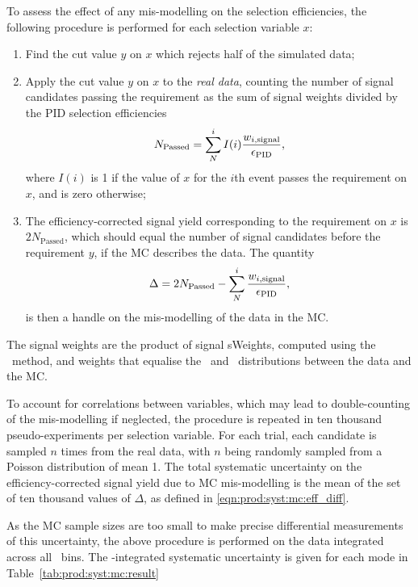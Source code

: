 To assess the effect of any mis-modelling on the selection efficiencies, the 
following procedure is performed for each selection variable $x$:
\begin{enumerate}
  \item Find the cut value $y$ on $x$ which rejects half of the simulated data;
  \item Apply the cut value $y$ on $x$ to the \emph{real data}, counting the 
    number of signal candidates passing the requirement as the sum of signal 
    weights divided by the \ac{PID} selection efficiencies
    \begin{equation}
      N_{\text{Passed}} = \sum_{N}^{i} I(i)\frac{w_{i,\text{signal}}}{\epsilon_{\textnormal{PID}}},
    \end{equation}
    where $I(i)$ is 1 if the value of $x$ for the $i$th event passes the 
    requirement on $x$, and is zero otherwise;
  \item The efficiency-corrected signal yield corresponding to the requirement 
    on $x$ is $2N_{\text{Passed}}$, which should equal the number of signal 
    candidates before the requirement $y$, if the \ac{MC} describes the data.  
    The quantity
    \begin{equation}
      \Delta = 2N_{\text{Passed}} - \sum_{N}^{i} \frac{w_{i,\text{signal}}}{\epsilon_{\textnormal{PID}}},
      \label{eqn:prod:syst:mc:eff_diff}
    \end{equation}
    is then a handle on the mis-modelling of the data in the \ac{MC}.
\end{enumerate}
The signal weights are the product of signal sWeights, computed using the \sPlot\ method, and weights that equalise the \pT\ and \rapidity\ distributions between the data and the \ac{MC}.

To account for correlations between variables, which may lead to 
double-counting of the mis-modelling if neglected, the procedure is repeated 
in ten thousand pseudo-experiments per selection variable.
For each trial, each candidate is sampled $n$ times from the real data, with $n$ being randomly sampled from a Poisson distribution of mean 1.
The total systematic uncertainty on the efficiency-corrected signal yield due 
to \ac{MC} mis-modelling is the mean of the set of ten thousand values of $\Delta$, as defined in \cref{eqn:prod:syst:mc:eff_diff}.

As the \ac{MC} sample sizes are too small to make precise differential 
measurements of this uncertainty, the above procedure is performed on the data 
integrated across all \pTy\ bins.
The \pTy-integrated systematic uncertainty is given for each mode in 
Table~\ref{tab:prod:syst:mc:result}


